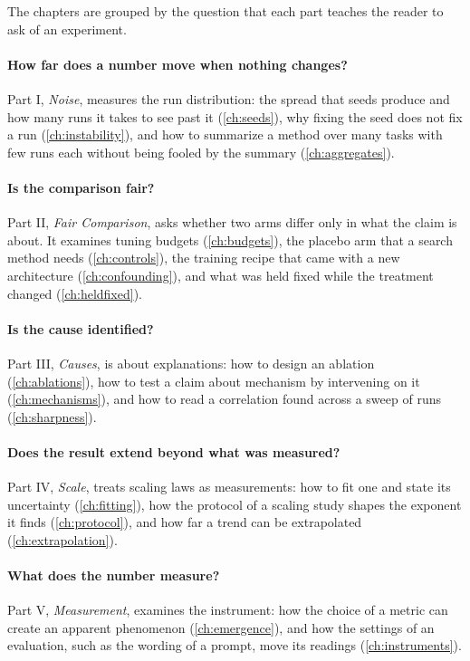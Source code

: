 \begin{refsection}

The chapters are grouped by the question that each part teaches the reader to ask of an experiment.

\paragraph{How far does a number move when nothing changes?} Part I, \emph{Noise}, measures the run distribution: the spread that seeds produce and how many runs it takes to see past it (\cref{ch:seeds}), why fixing the seed does not fix a run (\cref{ch:instability}), and how to summarize a method over many tasks with few runs each without being fooled by the summary (\cref{ch:aggregates}).

\paragraph{Is the comparison fair?} Part II, \emph{Fair Comparison}, asks whether two arms differ only in what the claim is about. It examines tuning budgets (\cref{ch:budgets}), the placebo arm that a search method needs (\cref{ch:controls}), the training recipe that came with a new architecture (\cref{ch:confounding}), and what was held fixed while the treatment changed (\cref{ch:heldfixed}).

\paragraph{Is the cause identified?} Part III, \emph{Causes}, is about explanations: how to design an ablation (\cref{ch:ablations}), how to test a claim about mechanism by intervening on it (\cref{ch:mechanisms}), and how to read a correlation found across a sweep of runs (\cref{ch:sharpness}).

\paragraph{Does the result extend beyond what was measured?} Part IV, \emph{Scale}, treats scaling laws as measurements: how to fit one and state its uncertainty (\cref{ch:fitting}), how the protocol of a scaling study shapes the exponent it finds (\cref{ch:protocol}), and how far a trend can be extrapolated (\cref{ch:extrapolation}).

\paragraph{What does the number measure?} Part V, \emph{Measurement}, examines the instrument: how the choice of a metric can create an apparent phenomenon (\cref{ch:emergence}), and how the settings of an evaluation, such as the wording of a prompt, move its readings (\cref{ch:instruments}).


\end{refsection}
